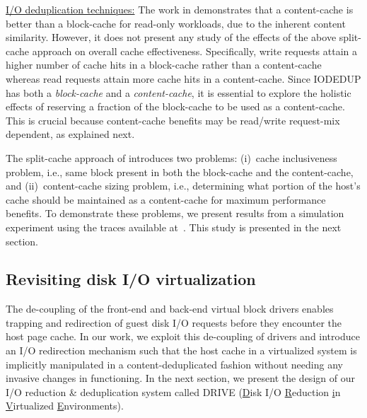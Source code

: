 \underline{I/O deduplication techniques:}
The work in \cite{iodedup} demonstrates that a 
content-cache 
is better than a block-cache for read-only workloads,
due to the inherent content similarity.
However, it does not present any study of the effects of the above
split-cache approach on overall cache effectiveness.
Specifically,
write requests attain a higher number of cache hits in a block-cache rather
than a content-cache~\cite{iodedup} whereas read requests attain more 
cache hits in a content-cache. 
Since IODEDUP has both 
a \textit{block-cache} and a \textit{content-cache}, 
it is essential to explore the holistic effects of reserving a fraction of the
block-cache to be used as a content-cache. This is
crucial because content-cache benefits may be read/write 
request-mix dependent, as explained next.

The split-cache approach of \cite{iodedup} introduces two problems:
(i)~cache inclusiveness problem, i.e.,
same block present in both the block-cache and the content-cache, and
(ii)~content-cache sizing problem, i.e., determining what portion of 
the host's cache should be maintained as a content-cache
for maximum performance benefits.
To demonstrate these problems, we present results from a simulation experiment
using the traces %
available at~\cite{iodedup-online}. This study is presented in the next 
section.

\subsection{Revisiting disk I/O virtualization}
The de-coupling of the front-end and back-end virtual block drivers
enables trapping and redirection 
of guest disk I/O requests before they 
encounter the host page cache.
In our work, we exploit this de-coupling of drivers and introduce 
an I/O redirection mechanism such that the host cache in a virtualized
system is implicitly manipulated in a
content-deduplicated fashion without needing any invasive changes
in functioning.
In the next section, we present the design of our I/O reduction 
\& deduplication system called DRIVE (\underline{D}isk I/O 
\underline{R}eduction \underline{i}n 
\underline{V}irtualized \underline{E}nvironments).
